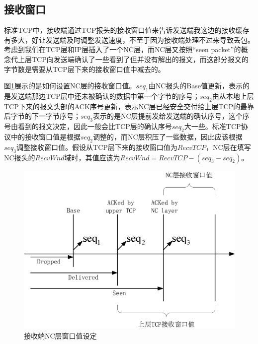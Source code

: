 \subsection{接收窗口}
标准TCP中，接收端通过TCP报头的接收窗口值来告诉发送端我这边的接收缓存有多大，好让发送端及时调整发送速度，不至于因为接收端处理不过来导致丢包。考虑到我们在TCP层和IP层插入了一个NC层，而NC层又按照“seen packet”的概念代上层TCP向发送端确认了一些看到了但并没有解出的报文，而这部分报文的字节数是需要从TCP层下来的接收窗口值中减去的。
\par
图\ref{RCVWND_EPS}展示的是如何设置NC层的接收窗口值。$seq_{1}$由NC报头的Base值更新，表示的是发送端那边TCP层中还未被确认的数据中第一个字节的序号；$seq_{2}$由从本地上层TCP下来的报文头部的ACK序号更新，表示NC层已经安全交付给上层TCP的最靠后字节的下一字节序号；$seq_{3}$表示的是NC层提前发给发送端的确认序号，这个序号由看到的报文决定，因此一般会比TCP层的确认序号$seq_{2}$大一些。标准TCP协议中的接收窗口值是根据$seq_{2}$调整的，而NC层积压了一些数据，因此应该根据$seq_{3}$调整接收窗口值。假设从TCP层下来的接收窗口值为$RecvTCP$，NC层在填写NC报头的$RecvWnd$域时，其值应该为$RecvWnd=RecvTCP-\left(seq_{3}-seq_{2}\right)$。
\begin{figure}[htbp]
	\centering
	\includegraphics[width=5in]{figures/rcvwnd.eps}
	\caption{接收端NC层窗口值设定}
	\label{RCVWND_EPS}
\end{figure}
